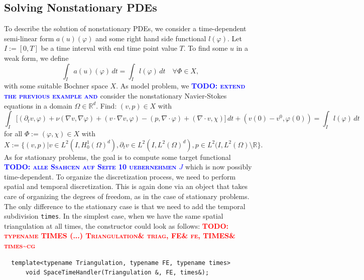 \documentclass[prodmode,acmtoms]{acmsmall}
\numberwithin{equation}{section}
\renewcommand{\phi}{\varphi}
\newcommand{\todo}[1]{\textbf{\textsc{\textcolor{blue}{TODO: #1}}}}
\newcommand{\todocg}[1]{\textbf{\textsc{\textcolor{red}{TODO: #1\textasciitilde cg}}}}
\begin{document}
\subsection{Solving Nonstationary PDEs}\label{sec:timedep}
To describe the solution of nonstationary 
PDEs, we consider a time-dependent semi-linear form $a(u)(\phi)$ and some
right hand side functional $l(\phi)$.
Let $I:=[0,T]$ be a time interval with end time point value $T$.
To find some $u$ in a weak form, we define
\[
\int_I a(u)(\phi)\, dt = \int_I l(\phi)\, dt \quad \forall\Phi\in X,
\]
with some suitable Bochner space $X$.  As model problem,
we 
\todo{extend the previous example and }consider the nonstationary Navier-Stokes equations
in a domain $\Omega\in\mathbb{R}^d$. Find: 
$(v,p)\in X$ with
\[
\int_I \bigl[ (\partial_t v, \phi)
+ \nu (\nabla v, \nabla \phi) + (v\cdot\nabla v, \phi)
- (p,\nabla\cdot \phi)
+ (\nabla\cdot v, \chi)\bigr] \, dt
+ (v(0) - v^0, \phi(0))
= \int_I l(\phi) \, dt 
\]
for all $\Phi:= (\phi, \chi) \in X$ with
\[
X:= \bigl\{ 
(v,p) | v\in L^2(I,H_0^1(\Omega)^d) , 
\partial_t v\in L^2(I, L^2(\Omega)^d), 
p\in L^2(I,L^2(\Omega)\setminus\mathbb{R} \bigr\}.
\]
As for stationary problems, the goal is to compute
some target functional \todo{alle Ssahcen auf Seite 10 uebernehmen $J$} which is now possibly 
time-dependent. To organize the discretization 
process, we need to perform spatial and temporal 
discretization. This is again done via
an object that takes care of organizing the degrees of 
freedom, as in the case of stationary problems.
The only difference to the stationary case is that we need to 
add the temporal subdivision \texttt{times}. In the simplest 
case, when we have the same spatial triangulation 
at all times, the constructor could look as follows:
\todocg{typename TIMES (...) Triangulation\& triag, FE\& fe, TIMES\& times}
\begin{lstlisting}
  template<typename Triangulation, typename FE, typename times>
      void SpaceTimeHandler(Triangulation &, FE, times&);
\end{lstlisting}
\end{document}
